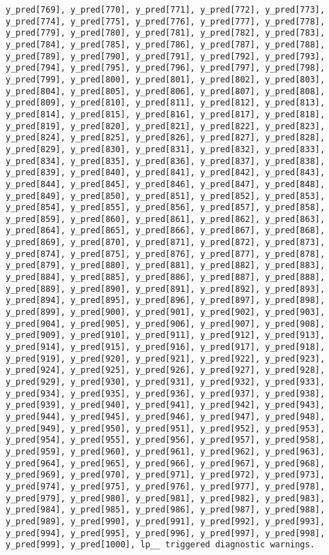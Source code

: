 \documentclass[
  letterpaper,
  DIV=11,
  numbers=noendperiod]{scrartcl}
\begin{document}
\begin{verbatim}
y_pred[769], y_pred[770], y_pred[771], y_pred[772], y_pred[773],
y_pred[774], y_pred[775], y_pred[776], y_pred[777], y_pred[778],
y_pred[779], y_pred[780], y_pred[781], y_pred[782], y_pred[783],
y_pred[784], y_pred[785], y_pred[786], y_pred[787], y_pred[788],
y_pred[789], y_pred[790], y_pred[791], y_pred[792], y_pred[793],
y_pred[794], y_pred[795], y_pred[796], y_pred[797], y_pred[798],
y_pred[799], y_pred[800], y_pred[801], y_pred[802], y_pred[803],
y_pred[804], y_pred[805], y_pred[806], y_pred[807], y_pred[808],
y_pred[809], y_pred[810], y_pred[811], y_pred[812], y_pred[813],
y_pred[814], y_pred[815], y_pred[816], y_pred[817], y_pred[818],
y_pred[819], y_pred[820], y_pred[821], y_pred[822], y_pred[823],
y_pred[824], y_pred[825], y_pred[826], y_pred[827], y_pred[828],
y_pred[829], y_pred[830], y_pred[831], y_pred[832], y_pred[833],
y_pred[834], y_pred[835], y_pred[836], y_pred[837], y_pred[838],
y_pred[839], y_pred[840], y_pred[841], y_pred[842], y_pred[843],
y_pred[844], y_pred[845], y_pred[846], y_pred[847], y_pred[848],
y_pred[849], y_pred[850], y_pred[851], y_pred[852], y_pred[853],
y_pred[854], y_pred[855], y_pred[856], y_pred[857], y_pred[858],
y_pred[859], y_pred[860], y_pred[861], y_pred[862], y_pred[863],
y_pred[864], y_pred[865], y_pred[866], y_pred[867], y_pred[868],
y_pred[869], y_pred[870], y_pred[871], y_pred[872], y_pred[873],
y_pred[874], y_pred[875], y_pred[876], y_pred[877], y_pred[878],
y_pred[879], y_pred[880], y_pred[881], y_pred[882], y_pred[883],
y_pred[884], y_pred[885], y_pred[886], y_pred[887], y_pred[888],
y_pred[889], y_pred[890], y_pred[891], y_pred[892], y_pred[893],
y_pred[894], y_pred[895], y_pred[896], y_pred[897], y_pred[898],
y_pred[899], y_pred[900], y_pred[901], y_pred[902], y_pred[903],
y_pred[904], y_pred[905], y_pred[906], y_pred[907], y_pred[908],
y_pred[909], y_pred[910], y_pred[911], y_pred[912], y_pred[913],
y_pred[914], y_pred[915], y_pred[916], y_pred[917], y_pred[918],
y_pred[919], y_pred[920], y_pred[921], y_pred[922], y_pred[923],
y_pred[924], y_pred[925], y_pred[926], y_pred[927], y_pred[928],
y_pred[929], y_pred[930], y_pred[931], y_pred[932], y_pred[933],
y_pred[934], y_pred[935], y_pred[936], y_pred[937], y_pred[938],
y_pred[939], y_pred[940], y_pred[941], y_pred[942], y_pred[943],
y_pred[944], y_pred[945], y_pred[946], y_pred[947], y_pred[948],
y_pred[949], y_pred[950], y_pred[951], y_pred[952], y_pred[953],
y_pred[954], y_pred[955], y_pred[956], y_pred[957], y_pred[958],
y_pred[959], y_pred[960], y_pred[961], y_pred[962], y_pred[963],
y_pred[964], y_pred[965], y_pred[966], y_pred[967], y_pred[968],
y_pred[969], y_pred[970], y_pred[971], y_pred[972], y_pred[973],
y_pred[974], y_pred[975], y_pred[976], y_pred[977], y_pred[978],
y_pred[979], y_pred[980], y_pred[981], y_pred[982], y_pred[983],
y_pred[984], y_pred[985], y_pred[986], y_pred[987], y_pred[988],
y_pred[989], y_pred[990], y_pred[991], y_pred[992], y_pred[993],
y_pred[994], y_pred[995], y_pred[996], y_pred[997], y_pred[998],
y_pred[999], y_pred[1000], lp__ triggered diagnostic warnings.


\end{verbatim}
\end{document}
